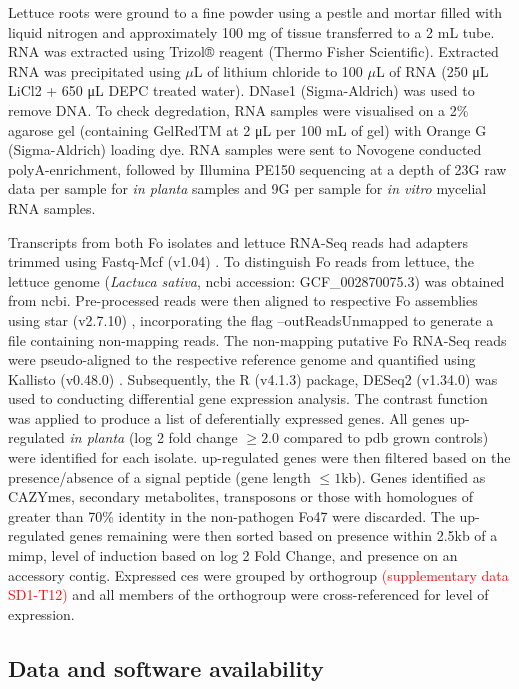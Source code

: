 Lettuce roots were ground to a fine powder using a pestle and mortar filled with liquid nitrogen and approximately 100 mg of tissue transferred to a 2 mL tube. RNA was extracted using Trizol® reagent (Thermo Fisher Scientific). Extracted RNA was precipitated using \(\mu\)L of lithium chloride to 100 \(\mu\)L of RNA (250 μL LiCl2 + 650 μL DEPC treated water). DNase1 (Sigma-Aldrich) was used to remove DNA. To check degredation, RNA samples were visualised on a 2\% agarose gel (containing GelRedTM at 2 μL per 100 mL of gel) with Orange G (Sigma-Aldrich) loading dye. RNA samples were sent to  Novogene conducted polyA-enrichment, followed by Illumina PE150 sequencing at a depth of 23G raw data per sample for \textit{in planta} samples and 9G per sample for \textit{in vitro} mycelial RNA samples.

Transcripts from both \ac{Fo} isolates and lettuce RNA-Seq reads had  adapters trimmed using Fastq-Mcf (v1.04) \parencite{Aronesty2013}. To distinguish \ac{Fo} reads from lettuce, the lettuce genome (\textit{Lactuca sativa}, \ac{ncbi} accession: GCF\_002870075.3) was obtained from \ac{ncbi}. Pre-processed reads were then aligned to respective \ac{Fo} assemblies using \ac{star} (v2.7.10) \parencite{Dobin2013}, incorporating the flag --outReadsUnmapped to generate a file containing non-mapping reads. The non-mapping putative \ac{Fo} RNA-Seq reads were pseudo-aligned to the respective reference genome and quantified using Kallisto (v0.48.0) \parencite{Bray2016}. Subsequently, the R (v4.1.3) \parencite{R} package, DESeq2 (v1.34.0) \parencite{Love2014} was used to conducting differential gene expression analysis. The contrast function was applied to produce a list of deferentially expressed genes. All genes up-regulated \textit{in planta} (log 2 fold change $\ge2.0$ compared to \ac{pdb} grown controls) were identified for each isolate. up-regulated genes were then filtered based on the presence/absence of a signal peptide (gene length $\le1$kb). Genes identified as CAZYmes, secondary metabolites, transposons or those with homologues of greater than 70\% identity in the non-pathogen Fo47 were discarded. The up-regulated genes remaining were then sorted based on presence within 2.5kb of a \ac{mimp}, level of induction based on log 2 Fold Change, and presence on an accessory contig. Expressed \acp{ce} were grouped by orthogroup \textcolor{red}{(supplementary data SD1-T12)} and all members of the orthogroup were cross-referenced for level of expression. 

\subsection{Data and software availability}


